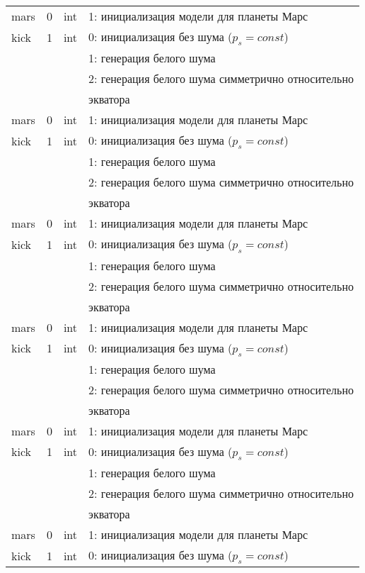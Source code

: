 \begin{longtable*}[c]{|l|c|l|l|}
    mars & 0 & int & 1: инициализация модели для планеты Марс     \\
    kick & 1 & int & 0: инициализация без шума (\(p_s = const\)) \\
    &   &     & 1: генерация белого шума                  \\
    &   &     & 2: генерация белого шума симметрично относительно \\
    & & & экватора    \\
    mars & 0 & int & 1: инициализация модели для планеты Марс     \\
    kick & 1 & int & 0: инициализация без шума (\(p_s = const\)) \\
    &   &     & 1: генерация белого шума                  \\
    &   &     & 2: генерация белого шума симметрично относительно \\
    & & & экватора    \\
    mars & 0 & int & 1: инициализация модели для планеты Марс     \\
    kick & 1 & int & 0: инициализация без шума (\(p_s = const\)) \\
    &   &     & 1: генерация белого шума                  \\
    &   &     & 2: генерация белого шума симметрично относительно \\
    & & & экватора    \\
    mars & 0 & int & 1: инициализация модели для планеты Марс     \\
    kick & 1 & int & 0: инициализация без шума (\(p_s = const\)) \\
    &   &     & 1: генерация белого шума                  \\
    &   &     & 2: генерация белого шума симметрично относительно \\
    & & & экватора    \\
    mars & 0 & int & 1: инициализация модели для планеты Марс     \\
    kick & 1 & int & 0: инициализация без шума (\(p_s = const\)) \\
    &   &     & 1: генерация белого шума                  \\
    &   &     & 2: генерация белого шума симметрично относительно \\
    & & & экватора    \\
    mars & 0 & int & 1: инициализация модели для планеты Марс     \\
    kick & 1 & int & 0: инициализация без шума (\(p_s = const\)) \\

\end{longtable*}

